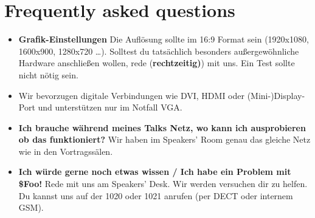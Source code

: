 \documentclass[paper=a4]{scrartcl}
\begin{document}
\section*{Frequently asked questions}
\begin{itemize}
	\item \textbf{Grafik-Einstellungen} Die Auflösung sollte im 16:9 Format sein (1920x1080, 1600x900, 1280x720 \ldots). Solltest du tatsächlich besonders außergewöhnliche Hardware anschließen wollen, rede (\textbf{rechtzeitig)}) mit uns. Ein Test sollte nicht nötig sein.
	\item Wir bevorzugen digitale Verbindungen wie DVI, HDMI oder (Mini-)Display-Port und unterstützen nur im Notfall VGA.
	\item \textbf{Ich brauche während meines Talks Netz, wo kann ich ausprobieren ob das funktioniert?} Wir haben im Speakers' Room genau das gleiche Netz wie in den Vortragssälen.
	\item \textbf{Ich würde gerne noch etwas wissen / Ich habe ein Problem mit \$Foo!} Rede mit uns am Speakers' Desk. Wir werden versuchen dir zu helfen. Du kannst uns auf der 1020 oder 1021 anrufen (per DECT oder internem GSM).
\end{itemize}
\end{document}
